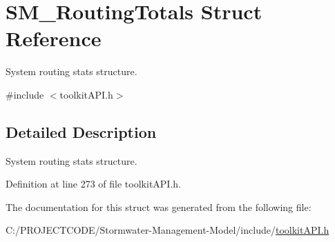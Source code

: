 \hypertarget{struct_s_m___routing_totals}{}\section{S\+M\+\_\+\+Routing\+Totals Struct Reference}
\label{struct_s_m___routing_totals}


System routing stats structure.  




{\ttfamily \#include $<$toolkit\+A\+P\+I.\+h$>$}



\subsection{Detailed Description}
System routing stats structure. 

Definition at line 273 of file toolkit\+A\+P\+I.\+h.



The documentation for this struct was generated from the following file\+:\begin{DoxyCompactItemize}
\item 
C\+:/\+P\+R\+O\+J\+E\+C\+T\+C\+O\+D\+E/\+Stormwater-\/\+Management-\/\+Model/include/\hyperlink{toolkit_a_p_i_8h}{toolkit\+A\+P\+I.\+h}\end{DoxyCompactItemize}
